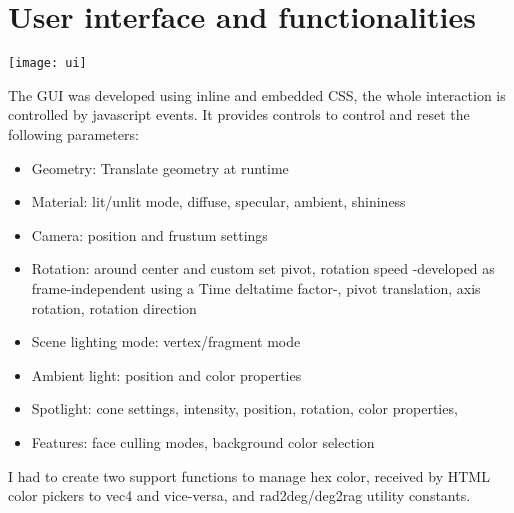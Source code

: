 \documentclass[10pt,a4paper]{article}
\begin{document}
\section{User interface and functionalities}

\begin{center}
\texttt{[image: ui]}
\end{center}
 
The GUI was developed using inline and embedded CSS, the whole interaction is controlled by javascript events. It provides controls to control and reset the following parameters:
 
 \begin{itemize}
 \item Geometry: Translate geometry at runtime
 \item Material: lit/unlit mode, diffuse, specular, ambient, shininess
 \item Camera: position and frustum settings
 \item Rotation: around center and custom set pivot, rotation speed -developed as frame-independent using a Time deltatime factor-, pivot translation, axis rotation, rotation direction
 \item Scene lighting mode: vertex/fragment mode
 \item Ambient light: position and color properties
 \item Spotlight: cone settings, intensity, position, rotation, color properties, 
 \item Features: face culling modes, background color selection
 \end{itemize}

I had to create two support functions to manage hex color, received by HTML color pickers to vec4 and vice-versa, and rad2deg/deg2rag utility constants.
\end{document}
